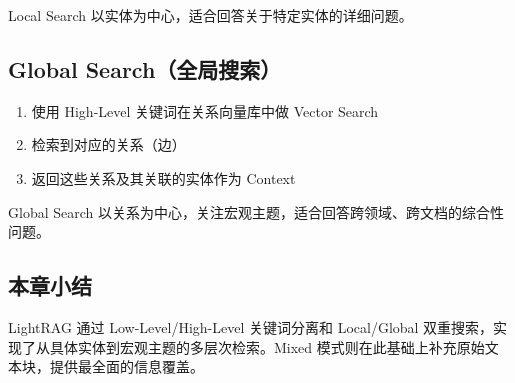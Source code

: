 Local Search 以实体为中心，适合回答关于特定实体的详细问题。

\subsection{Global Search（全局搜索）}

\begin{enumerate}
    \item 使用 High-Level 关键词在关系向量库中做 Vector Search
    \item 检索到对应的关系（边）
    \item 返回这些关系及其关联的实体作为 Context
\end{enumerate}

Global Search 以关系为中心，关注宏观主题，适合回答跨领域、跨文档的综合性问题。

\subsection{本章小结}

LightRAG 通过 Low-Level/High-Level 关键词分离和 Local/Global 双重搜索，实现了从具体实体到宏观主题的多层次检索。Mixed 模式则在此基础上补充原始文本块，提供最全面的信息覆盖。


